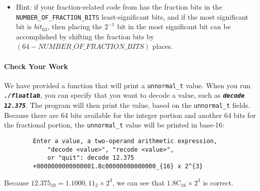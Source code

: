 \begin{description}
    \begin{itemize}
        \item Hint: if your fraction-related code from  has the fraction bits in the \lstinline{NUMBER_OF_FRACTION_BITS} least-significant bits,
            and if the most significant bit is $bit_{63}$, then placing the $2^{-1}$ bit in the most significant bit can be accomplished by shifting the fraction bits by $(64 - NUMBER\_OF\_FRACTION\_BITS)$ places.
    \end{itemize}
\end{description}


\paragraph*{Check Your Work}

\begin{description}
\end{description}
We have provided a function that will print a \lstinline{unnormal_t} value.
When you run \texttt{\textbf{\textit{./floatlab}}}, you can specify that you want to decode a value, such as \texttt{\textbf{\textit{decode 12.375}}}.
The program will then print the value, based on the \lstinline{unnormal_t} fields.
Because there are 64 bits available for the integer portion and another 64 bits for the fractional portion, the \lstinline{unnormal_t} value will be printed in base-16:

\begin{verbatim}
        Enter a value, a two-operand arithmetic expression,
            "decode <value>", "recode <value>",
            or "quit": decode 12.375
        +0000000000000001.8c00000000000000_{16} x 2^{3}
\end{verbatim}

Because $12.375_{10} = 1.1000,11_{2} \times 2^3$, we can see that $1.8\mathrm{C}_{16} \times 2^3$ is correct.

%
%
%

\begin{description}
\end{description}